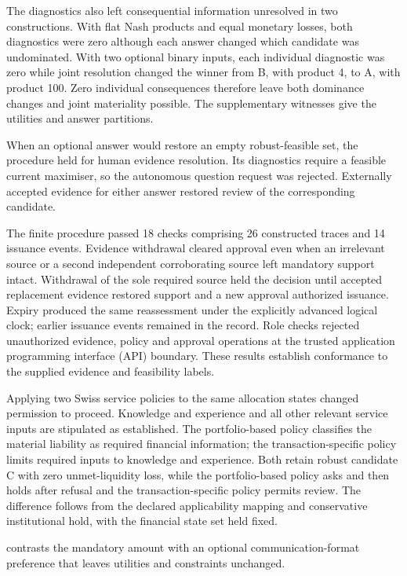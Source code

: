 \documentclass[oneside,10pt,english]{swissi}
\begin{document}
The diagnostics also left consequential information unresolved in two constructions. With flat Nash products and equal monetary losses, both diagnostics were zero although each answer changed which candidate was undominated. With two optional binary inputs, each individual diagnostic was zero while joint resolution changed the winner from B, with product 4, to A, with product 100. Zero individual consequences therefore leave both dominance changes and joint materiality possible. The supplementary witnesses give the utilities and answer partitions.

When an optional answer would restore an empty robust-feasible set, the procedure held for human evidence resolution. Its diagnostics require a feasible current maximiser, so the autonomous question request was rejected. Externally accepted evidence for either answer restored review of the corresponding candidate.

The finite procedure passed 18 checks comprising 26 constructed traces and 14 issuance events. Evidence withdrawal cleared approval even when an irrelevant source or a second independent corroborating source left mandatory support intact. Withdrawal of the sole required source held the decision until accepted replacement evidence restored support and a new approval authorized issuance. Expiry produced the same reassessment under the explicitly advanced logical clock; earlier issuance events remained in the record. Role checks rejected unauthorized evidence, policy and approval operations at the trusted application programming interface (API) boundary. These results establish conformance to the supplied evidence and feasibility labels.

Applying two Swiss service policies to the same allocation states changed permission to proceed. Knowledge and experience and all other relevant service inputs are stipulated as established. The portfolio-based policy classifies the material liability as required financial information; the transaction-specific policy limits required inputs to knowledge and experience. Both retain robust candidate C with zero unmet-liquidity loss, while the portfolio-based policy asks and then holds after refusal and the transaction-specific policy permits review. The difference follows from the declared applicability mapping and conservative institutional hold, with the financial state set held fixed.

 contrasts the mandatory amount with an optional communication-format preference that leaves utilities and constraints unchanged.
\end{document}

